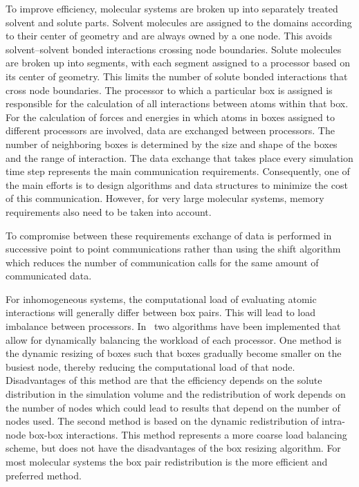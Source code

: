 To improve efficiency, molecular systems are broken up into separately
treated solvent and solute parts.  Solvent molecules are assigned to
the domains according to their center of geometry and are always owned
by a one node. This avoids solvent--solvent bonded interactions
crossing node boundaries.  Solute molecules are broken up into
segments, with each segment assigned to a processor based on its
center of geometry.  This limits the number of solute bonded
interactions that cross node boundaries.  The processor to which a
particular box is assigned is responsible for the calculation of all
interactions between atoms within that box.  For the calculation of
forces and energies in which atoms in boxes assigned to different
processors are involved, data are exchanged between processors. The
number of neighboring boxes is determined by the size and shape of the
boxes and the range of interaction. The data exchange that takes place
every simulation time step represents the main communication
requirements.  Consequently, one of the main efforts is to design
algorithms and data structures to minimize the cost of this
communication. However, for very large molecular systems, memory
requirements also need to be taken into account.

To compromise between these requirements exchange of data is performed
in successive point to point communications rather than using the
shift algorithm which reduces the number of communication calls
for the same amount of communicated data.

For inhomogeneous systems, the computational load of evaluating 
atomic interactions will generally differ between box pairs. 
This will lead to load imbalance between processors. In \nwargos\ 
two algorithms have been implemented that allow for dynamically 
balancing the workload of each processor.
One method is the dynamic resizing of boxes such that boxes gradually
become smaller on the busiest node, thereby reducing the computational
load of that node. Disadvantages of this method are that the 
efficiency depends on the solute distribution in the simulation volume
and the redistribution of work depends on the number of nodes which
could lead to results that depend on the number of nodes used.
The second method is based on the dynamic redistribution of intra-node
box-box interactions. This method represents a more coarse load
balancing scheme, but does not have the disadvantages of the box
resizing algorithm. For most molecular systems the box pair
redistribution is the more efficient and preferred  method.

